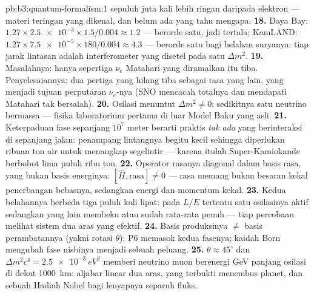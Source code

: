 \begin{solution}{pb:b3:quantum-formalism:1}
sepuluh juta kali lebih ringan daripada elektron --- materi teringan
yang dikenal, dan belum ada yang tahu mengapa.
\textbf{18.} Daya Bay: $1.27 \times \num{2.5e-3} \times 1.5/0.004
\approx 1.2$ --- berorde satu, jadi tertala; KamLAND: $1.27 \times
\num{7.5e-5} \times 180/0.004 \approx 4.3$ --- berorde satu bagi
belahan suryanya: tiap jarak lintasan adalah interferometer yang disetel
pada satu $\Delta m^2$.
\textbf{19.} Masalahnya: hanya sepertiga $\nu_e$ Matahari yang
diramalkan itu tiba. Penyelesaiannya: dua pertiga yang hilang tiba
sebagai rasa yang lain, yang menjadi tujuan perputaran $\nu_e$-nya (SNO
mencacah totalnya dan mendapati Matahari tak bersalah).
\textbf{20.} Osilasi menuntut $\Delta m^2 \neq 0$: sedikitnya satu
neutrino bermassa --- fisika laboratorium pertama di luar Model Baku
yang asli.
\textbf{21.} Keterpaduan fase sepanjang $10^7$ meter berarti praktis
\emph{tak ada} yang berinteraksi di sepanjang jalan: penampang
lintangnya begitu kecil sehingga diperlukan ribuan ton air untuk
menangkap segelintir --- karena itulah Super-Kamiokande berbobot lima
puluh ribu ton.
\textbf{22.} Operator rasanya diagonal dalam basis rasa, yang bukan
basis energinya: $[\hat H, \text{rasa}] \neq 0$ --- rasa memang bukan
besaran kekal penerbangan bebasnya, sedangkan energi dan momentum kekal.
\textbf{23.} Kedua belahannya berbeda tiga puluh kali lipat: pada
$L/E$ tertentu satu osilasinya aktif sedangkan yang lain membeku atau
sudah rata-rata penuh --- tiap percobaan melihat sistem dua aras yang
efektif.
\textbf{24.} Basis produksinya $\neq$ basis perambatannya (yakni
rotasi $\theta$); P6 memasok kedua fasenya; kaidah Born mengubah fase
nisbinya menjadi sebuah peluang.
\textbf{25.} $\theta \approx 45^\circ$ dan $\Delta m^2c^4 =
\qty{2.5e-3}{eV^2}$ memberi neutrino muon berenergi GeV panjang osilasi
di dekat \qty{1000}{km}: aljabar linear dua aras, yang terbukti menembus
planet, dan sebuah Hadiah Nobel bagi lenyapnya separuh fluks.
\end{solution}
